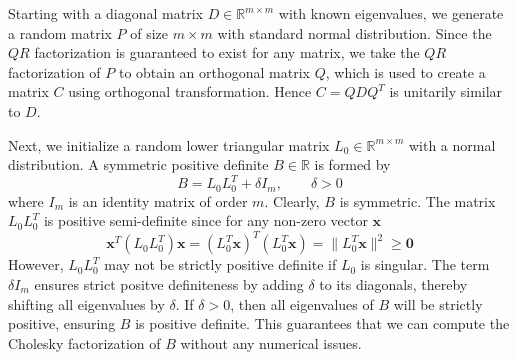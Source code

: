 \documentclass[12pt,gsu,online,openany,singleside,hidelinks]{gsudiss}
\begin{document}
Starting with a diagonal matrix $D \in \mathbb{R}^{m \times m}$ with known eigenvalues, we generate a random matrix $P$ of size $m \times m $ with standard normal distribution. Since the $QR$ factorization is guaranteed to exist for any matrix, we take the $QR$ factorization of $P$ to obtain an orthogonal matrix $Q$, which is used to create a matrix $C$ using orthogonal transformation. Hence $C = QDQ^T$ is unitarily similar to $D$.

Next, we initialize a random lower triangular matrix $L_0 \in \mathbb{R}^{m \times m}$ with a normal distribution. A symmetric positive definite $B \in \mathbb{R}$ is formed by
\begin{equation}
	B = L_0 L_0^T + \delta I_m, \qquad \delta > 0
\end{equation}
where $I_m$ is an identity matrix of order $m$. Clearly, $B$ is symmetric. The matrix $L_0L_0^T$ is positive semi-definite since for any non-zero vector $\mathbf{x}$
\begin{equation}
	\mathbf{x}^T(L_0L_0^T)\mathbf{x} = (L_0^T\mathbf{x})^T(L_0^T\mathbf{x}) = \| L_0^T\mathbf{x} \|^2 \geq \mathbf{0}
\end{equation}
However, $L_0L_0^T$ may not be strictly positive definite if $L_0$ is singular. The term $\delta I_m$ ensures strict positve definiteness by adding $\delta$ to its diagonals, thereby shifting all eigenvalues by $\delta$. If $\delta > 0$, then all eigenvalues of $B$ will be strictly positive, ensuring $B$ is positive definite. This guarantees that we can compute the Cholesky factorization of $B$ without any numerical issues.
\end{document}
